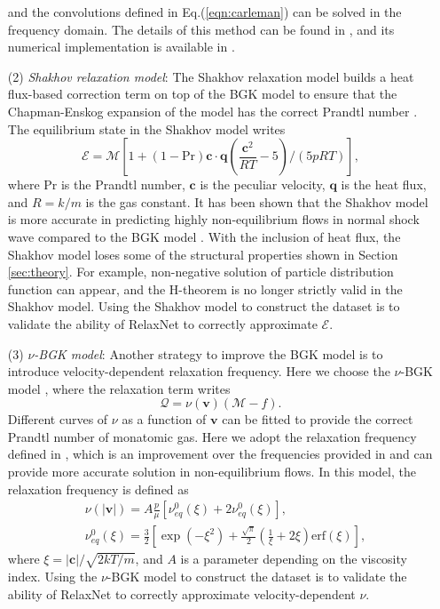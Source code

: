 \documentclass[preprint,3p,12pt,sort&compress]{elsarticle}
\begin{document}
\begin{enumerate}
  and the convolutions defined in Eq.(\ref{eqn:carleman}) can be solved in the frequency domain.
  The details of this method can be found in \cite{mouhot2006fast}, and its numerical implementation is available in \cite{xiao2021kinetic}.
  \item[(2)] \textit{Shakhov relaxation model}: The Shakhov relaxation model builds a heat flux-based correction term on top of the BGK model to ensure that the Chapman-Enskog expansion of the model has the correct Prandtl number \cite{shakhov1968generalization}.
  The equilibrium state in the Shakhov model writes
  \begin{equation}
      \mathcal E = \mathcal M \left[1+(1-\mathrm{Pr}) \mathbf{c} \cdot \mathbf{q}\left(\frac{\mathbf c^2}{R T}-5\right) /(5 p R T)\right],
  \end{equation}
    where Pr is the Prandtl number, $\mathbf c$ is the peculiar velocity, $\mathbf q$ is the heat flux, and $R=k/m$ is the gas constant.
    It has been shown that the Shakhov model is more accurate in predicting highly non-equilibrium flows in normal shock wave compared to the BGK model \cite{xu2011improved}.
  With the inclusion of heat flux, the Shakhov model loses some of the structural properties shown in Section \ref{sec:theory}.
  For example, non-negative solution of particle distribution function can appear, and the H-theorem is no longer strictly valid in the Shakhov model.
  Using the Shakhov model to construct the dataset is to validate the ability of RelaxNet to correctly approximate $\mathcal E$.
  \item[(3)] \textit{$\nu$-BGK model}: Another strategy to improve the BGK model is to introduce velocity-dependent relaxation frequency. Here we choose the $\nu$-BGK model \cite{mieussens2004numerical}, where the relaxation term writes
  \begin{equation}
      \mathcal Q = \nu(\mathbf v)(\mathcal M - f).
  \end{equation}
  Different curves of $\nu$ as a function of $\mathbf v$ can be fitted to provide the correct Prandtl number of monatomic gas.
  Here we adopt the relaxation frequency defined in \cite{yuan2022capturing}, which is an improvement over the frequencies provided in \cite{mieussens2004numerical} and can provide more accurate solution in non-equilibrium flows.
  In this model, the relaxation frequency is defined as
  \begin{equation}
  \begin{aligned}
      &\nu(|\mathbf v|) = A\frac{p}{\mu}\left[ \nu_{eq}^0(\xi) + 2\nu_{eq}^0(\xi) \right],\\
      &\nu_{eq}^0(\xi) = \frac{3}{2} \left[ \exp(-\xi^2) + \frac{\sqrt \pi}{2} \left( \frac{1}{\xi} + 2\xi \right) \mathrm{erf}(\xi)\right],
    \end{aligned}
    \label{eqn:nubgk frequency}
  \end{equation}
  where $\xi=|\mathbf c|/\sqrt{2kT/m}$, and $A$ is a parameter depending on the viscosity index.
  Using the $\nu$-BGK model to construct the dataset is to validate the ability of RelaxNet to correctly approximate velocity-dependent $\nu$.
\end{enumerate}
\end{document}
